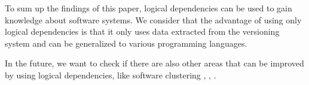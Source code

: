 \documentclass[runningheads]{comsis2}
\begin{document}
To sum up the findings of this paper, logical dependencies can be used to gain knowledge about software systems. We consider that the advantage of using only logical dependencies is that it only uses data extracted from the versioning system and can be generalized to various programming languages.

In the future, we want to check if there are also other areas that can be improved by using logical dependencies, like software clustering \cite{SoraConti}, \cite{Shtern:2012:CMS:2332427.2332428}, \cite{SoraSem13}.






%
%

\end{document}
